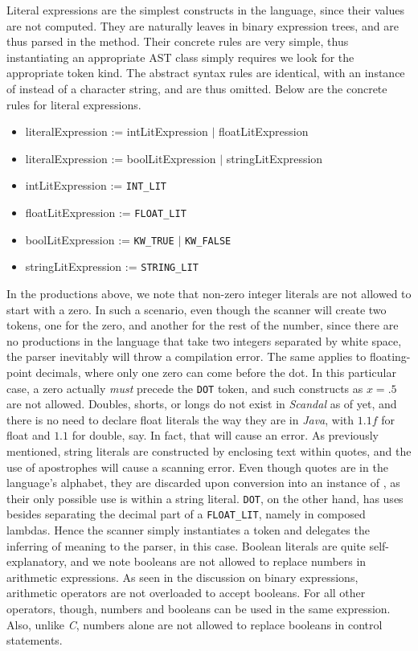 Literal expressions are the simplest constructs in the language, since their values are not computed. They are naturally leaves in binary expression trees, and are thus parsed in the  method. Their concrete rules are very simple, thus instantiating an appropriate AST class simply requires we look for the appropriate token kind. The abstract syntax rules are identical, with an instance of  instead of a character string, and are thus omitted. Below are the concrete rules for literal expressions.

\begin{itemize}
	\item literalExpression := intLitExpression $|$ floatLitExpression
	\item literalExpression := boolLitExpression $|$ stringLitExpression
	\item intLitExpression := \texttt{INT\_LIT}
	\item floatLitExpression := \texttt{FLOAT\_LIT}
	\item boolLitExpression := \texttt{KW\_TRUE} $|$ \texttt{KW\_FALSE}
	\item stringLitExpression := \texttt{STRING\_LIT}
\end{itemize}

In the productions above, we note that non-zero integer literals are not allowed to start with a zero. In such a scenario, even though the scanner will create two tokens, one for the zero, and another for the rest of the number, since there are no productions in the language that take two integers separated by white space, the parser inevitably will throw a compilation error. The same applies to floating-point decimals, where only one zero can come before the dot. In this particular case, a zero actually \emph{must} precede the \texttt{DOT} token, and such constructs as $x = .5$ are not allowed. Doubles, shorts, or longs do not exist in \emph{Scandal} as of yet, and there is no need to declare float literals the way they are in \emph{Java}, with $1.1f$ for float and $1.1$ for double, say. In fact, that will cause an error. As previously mentioned, string literals are constructed by enclosing text within quotes, and the use of apostrophes will cause a scanning error. Even though quotes are in the language's alphabet, they are discarded upon conversion into an instance of , as their only possible use is within a string literal. \texttt{DOT}, on the other hand, has uses besides separating the decimal part of a \texttt{FLOAT\_LIT}, namely in composed lambdas. Hence the scanner simply instantiates a token and delegates the inferring of meaning to the parser, in this case. Boolean literals are quite self-explanatory, and we note booleans are not allowed to replace numbers in arithmetic expressions. As seen in the discussion on binary expressions, arithmetic operators are not overloaded to accept booleans. For all other operators, though, numbers and booleans can be used in the same expression. Also, unlike \emph{C}, numbers alone are not allowed to replace booleans in control statements.

